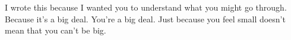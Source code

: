 I wrote this because I wanted you to understand what you might go through. Because it's a big deal. You're a big deal. Just because you feel small doesn't mean that you can't be big.